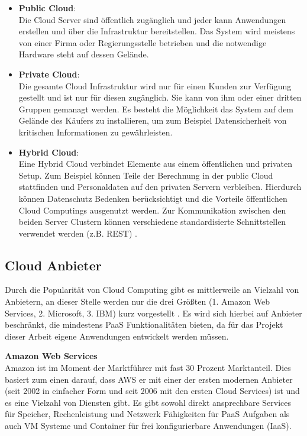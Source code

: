 \begin{itemize}
	\item \textbf{Public Cloud}:\\
	Die Cloud Server sind öffentlich zugänglich und jeder kann Anwendungen erstellen und über die Infrastruktur bereitstellen. Das System wird meistens von einer Firma oder Regierungsstelle betrieben und die notwendige Hardware steht auf dessen Gelände. 
	\item \textbf{Private Cloud}:\\
	Die gesamte Cloud Infrastruktur wird nur für einen Kunden zur Verfügung gestellt und ist nur für diesen zugänglich. Sie kann von ihm oder einer dritten Gruppen gemanagt werden. Es besteht die Möglichkeit das System auf dem Gelände des Käufers zu installieren, um zum Beispiel Datensicherheit von kritischen Informationen zu gewährleisten. 
	\item \textbf{Hybrid Cloud}:\\
	Eine Hybrid Cloud verbindet Elemente aus einem öffentlichen und privaten Setup. Zum Beispiel können Teile der Berechnung in der public Cloud stattfinden und Personaldaten auf den privaten Servern verbleiben. Hierdurch können Datenschutz Bedenken berücksichtigt und die Vorteile öffentlichen Cloud Computings ausgenutzt werden. Zur Kommunikation zwischen den beiden Server Clustern können verschiedene standardisierte Schnittstellen verwendet werden (z.B. REST)  \parencite{rafaels.2015}.
\end{itemize}

\subsection{Cloud Anbieter} \label{subsec:cloudprovider}
Durch die Popularität von Cloud Computing gibt es mittlerweile an Vielzahl von Anbietern, an dieser Stelle werden nur die drei Größten (1. Amazon Web Services, 2. Microsoft, 3. IBM) kurz vorgestellt \parencite{statistia.2016}. Es wird sich hierbei auf Anbieter beschränkt, die mindestens \acs{PaaS} Funktionalitäten bieten, da für das Projekt dieser Arbeit eigene Anwendungen entwickelt werden müssen.


\textbf{Amazon Web Services}\\
Amazon ist im Moment der Marktführer mit fast 30 Prozent Marktanteil. Dies basiert zum einen darauf, dass \ac{AWS} er mit einer der ersten modernen Anbieter (seit 2002 in einfacher Form und seit 2006 mit den ersten Cloud Services) ist und es eine Vielzahl von Diensten gibt. Es gibt sowohl direkt ansprechbare Services für Speicher, Rechenleistung und Netzwerk Fähigkeiten für \acs{PaaS} Aufgaben als auch VM Systeme und Container für frei konfigurierbare Anwendungen (\acs{IaaS}).

